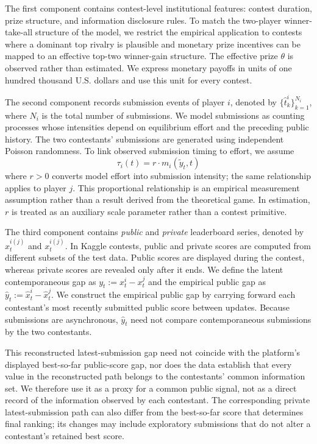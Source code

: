 \documentclass[mnsc]{informs3}
\begin{document}
The first component contains contest-level institutional features: contest duration, prize structure, and information disclosure rules.
To match the two-player winner-take-all structure of the model, we restrict the empirical application to contests where a dominant top rivalry is plausible and monetary prize incentives can be mapped to an effective top-two winner-gain structure.
The effective prize $\theta$ is observed rather than estimated. We express monetary payoffs in units of one hundred thousand U.S. dollars and use this unit for every contest.

The second component records submission events of player $i$, denoted by $\{\hat{t}^i_k\}_{k=1}^{N_i}$, where $N_i$ is the total number of submissions.
We model submissions as counting processes whose intensities depend on equilibrium effort and the preceding public history. The two contestants' submissions are generated using independent Poisson randomness. To link observed submission timing to effort, we assume
\begin{equation}\label{eq-model-intensity}
{\tau_i(t) = r \cdot m_i(\tilde{y}_t,t)}
\end{equation}
where \(r>0\) converts model effort into submission intensity; the same relationship applies to player \(j\). This proportional relationship is an empirical measurement assumption rather than a result derived from the theoretical game. In estimation, \(r\) is treated as an auxiliary scale parameter rather than a contest primitive.


The third component contains \textit{public} and \textit{private} leaderboard series, denoted by $\hat{x}^{i(j)}_t$ and $x^{i(j)}_t$.
In Kaggle contests, public and private scores are computed from different subsets of the test data. Public scores are displayed during the contest, whereas private scores are revealed only after it ends.
We define the latent contemporaneous gap as $y_t:=x_t^i-x_t^j$ and the empirical public gap as $\hat y_t:=\hat x_t^i-\hat x_t^j$. We construct the empirical public gap by carrying forward each contestant's most recently submitted public score between updates. Because submissions are asynchronous, $\hat y_t$ need not compare contemporaneous submissions by the two contestants.

This reconstructed latest-submission gap need not coincide with the platform's displayed best-so-far public-score gap, nor does the data establish that every value in the reconstructed path belongs to the contestants' common information set. We therefore use it as a proxy for a common public signal, not as a direct record of the information observed by each contestant. The corresponding private latest-submission path can also differ from the best-so-far score that determines final ranking; its changes may include exploratory submissions that do not alter a contestant's retained best score.
\end{document}
